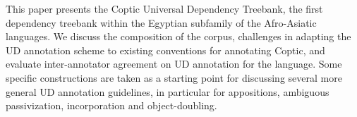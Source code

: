 This paper presents the Coptic Universal Dependency Treebank, the first dependency treebank within the Egyptian subfamily of the Afro-Asiatic languages. We discuss the composition of the corpus, challenges in adapting the UD annotation scheme to existing conventions for annotating Coptic, and evaluate inter-annotator agreement on UD annotation for the language. Some specific constructions are taken as a starting point for discussing several more general UD annotation guidelines, in particular for appositions, ambiguous passivization, incorporation and object-doubling.
